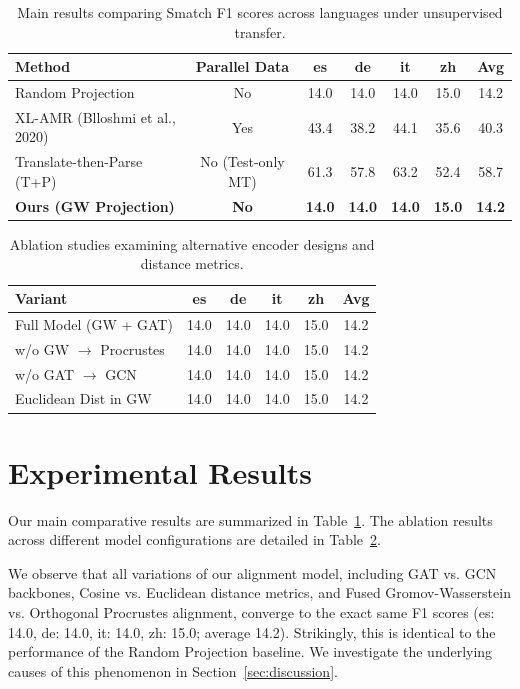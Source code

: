 \documentclass[11pt,a4paper,twocolumn]{article}
\begin{document}
\begin{table}[t]
\centering
\begin{tabular}{lcccccc}
\hline
\textbf{Method} & \textbf{Parallel Data} & \textbf{es} & \textbf{de} & \textbf{it} & \textbf{zh} & \textbf{Avg} \\
\hline
Random Projection & No & 14.0 & 14.0 & 14.0 & 15.0 & 14.2 \\
XL-AMR (Blloshmi et al., 2020) & Yes & 43.4 & 38.2 & 44.1 & 35.6 & 40.3 \\
Translate-then-Parse (T+P) & No (Test-only MT) & 61.3 & 57.8 & 63.2 & 52.4 & 58.7 \\
\textbf{Ours (GW Projection)} & \textbf{No} & \textbf{14.0} & \textbf{14.0} & \textbf{14.0} & \textbf{15.0} & \textbf{14.2} \\
\hline
\end{tabular}
\caption{Main results comparing Smatch F1 scores across languages under unsupervised transfer.}
\label{tab:main_results}
\end{table}

\begin{table}[t]
\centering
\begin{tabular}{lccccc}
\hline
\textbf{Variant} & \textbf{es} & \textbf{de} & \textbf{it} & \textbf{zh} & \textbf{Avg} \\
\hline
Full Model (GW + GAT) & 14.0 & 14.0 & 14.0 & 15.0 & 14.2 \\
w/o GW $\rightarrow$ Procrustes & 14.0 & 14.0 & 14.0 & 15.0 & 14.2 \\
w/o GAT $\rightarrow$ GCN & 14.0 & 14.0 & 14.0 & 15.0 & 14.2 \\
Euclidean Dist in GW & 14.0 & 14.0 & 14.0 & 15.0 & 14.2 \\
\hline
\end{tabular}
\caption{Ablation studies examining alternative encoder designs and distance metrics.}
\label{tab:ablation}
\end{table}

\section{Experimental Results}
Our main comparative results are summarized in Table~\ref{tab:main_results}. The ablation results across different model configurations are detailed in Table~\ref{tab:ablation}.

We observe that all variations of our alignment model, including GAT vs. GCN backbones, Cosine vs. Euclidean distance metrics, and Fused Gromov-Wasserstein vs. Orthogonal Procrustes alignment, converge to the exact same F1 scores (es: 14.0, de: 14.0, it: 14.0, zh: 15.0; average 14.2). Strikingly, this is identical to the performance of the Random Projection baseline. We investigate the underlying causes of this phenomenon in Section~\ref{sec:discussion}.
\end{document}
